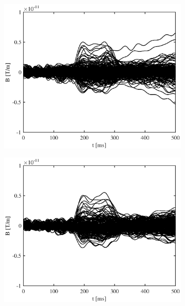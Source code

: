 \documentclass[doc,a4paper,12pt]{apa6}
\begin{document}
\begin{figure}
\begin{subfigure}[c]{0.36\textwidth}
    \label{img:butterfly:grad:sss:pa07}
  \end{subfigure}\vspace*{0.02\textwidth}
  \begin{subfigure}[c]{0.36\textwidth}
    \includegraphics[width=\textwidth]{ergebnisse/pa10/pa10a1_eve2_raw_grad_butterfly.eps}
    \label{img:butterfly:grad:raw:pa10}
  \end{subfigure}\hspace*{0.08\textwidth}
  \begin{subfigure}[c]{0.36\textwidth}
    \includegraphics[width=\textwidth]{ergebnisse/pa10/pa10a1_eve2_sss_grad_butterfly.eps}

\end{subfigure}
\end{figure}
\end{document}
